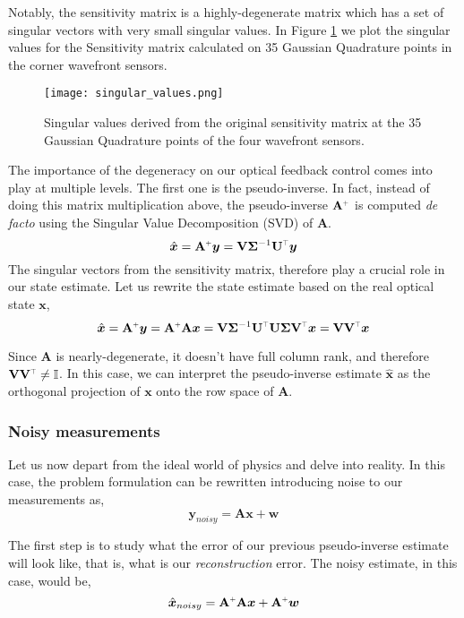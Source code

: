 \documentclass[SE,authoryear,toc]{lsstdoc}
\renewcommand{\v}[1]{\mathbf{#1}}
\newcommand{\plus}{\scalebox{0.6}{$+$}}
\newcommand{\tr}{\scalebox{0.6}{$\top$}}
\begin{document}
Notably, the sensitivity matrix is a highly-degenerate matrix which has a set of singular vectors with very small singular values. In Figure \ref{fig1} we plot the singular values for the Sensitivity matrix calculated on 35 Gaussian Quadrature points in the corner wavefront sensors. 

\begin{figure}[h!]
    \centering
    \texttt{[image: singular\_values.png]}
    \caption{Singular values derived from the original sensitivity matrix at the 35 Gaussian Quadrature points of the four wavefront sensors.}
    \label{fig1}
\end{figure}

The importance of the degeneracy on our optical feedback control comes into play at multiple levels. The first one is the pseudo-inverse. In fact, instead of doing this matrix multiplication above, the pseudo-inverse $\v{A}^{\plus}$ is computed \textit{de facto} using the Singular Value Decomposition (SVD) of $\v{A}$.
\begin{equation}
     \hat{\bm{x}} = \v{A}^{\plus}\bm{y} = \v{V} \v{\Sigma}^{-1} \v{U^{\tr}}\bm{y}
\end{equation}
The singular vectors from the sensitivity matrix, therefore play a crucial role in our state estimate. Let us rewrite the state estimate based on the real optical state $\bm{x}$,
\begin{equation}
     \hat{\bm{x}} = \v{A}^{\plus}\bm{y} = \v{A}^{\plus}\v{A}\bm{x} = \v{V}\v{\Sigma}^{-1} \v{U^{\tr}}\v{U} \v{\Sigma} \v{V^{\tr}}\bm{x} =  \v{V}\v{V^{\tr}}\bm{x}
\end{equation}

Since $\v{A}$ is nearly-degenerate, it doesn't have full column rank, and therefore $\v{V}\v{V^{\tr}} \neq \mathbb{I}$. In this case, we can interpret the pseudo-inverse estimate $\hat{\bm{x}}$ as the orthogonal projection of $\bm{x}$ onto the row space of $\v{A}$. 


\subsubsection*{Noisy measurements}
Let us now depart from the ideal world of physics and delve into reality. In this case, the problem formulation can be rewritten introducing noise to our measurements as,
\begin{equation}
    \bm{y}_{noisy} = \v{A} \bm{x} + \bm{w}
\end{equation}

The first step is to study what the error of our previous pseudo-inverse estimate will look like, that is, what is our \textit{reconstruction} error. The noisy estimate, in this case, would be, 
\begin{equation}
    \hat{\bm{x}}_{noisy} = \v{A}^{\plus}\v{A}\bm{x} +\v{A}^{\plus}\bm{w} 
\end{equation}
\end{document}
